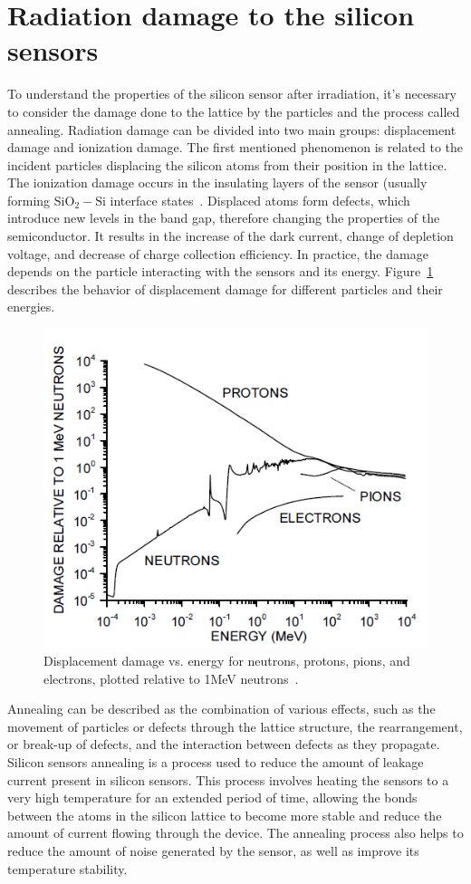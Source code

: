 \section{Radiation damage to the silicon sensors}
\label{silicon_damage}
To understand the properties of the silicon sensor after irradiation, it's necessary to consider the damage done to the lattice by the particles and the process called annealing. Radiation damage can be divided into two main groups: displacement damage and ionization damage. The first mentioned phenomenon is related to the incident particles displacing the silicon atoms from their position in the lattice. The ionization damage occurs in the insulating layers of the sensor (usually forming $\mathrm{SiO_{2}-Si}$ interface states~\cite{Moll:1999kv}. Displaced atoms form defects, which introduce new levels in the band gap, therefore changing the properties of the semiconductor. It results in the increase of the dark current, change of depletion voltage, and decrease of charge collection efficiency. In practice, the damage depends on the particle interacting with the sensors and its energy. Figure~\ref{fig_niel_si} describes the behavior of displacement damage for different particles and their energies.  
\begin{figure}[!h]
\centering
\includegraphics[width=0.7\columnwidth]{Chapter2/images/displacement_damage.png}
\caption{Displacement damage vs. energy for neutrons, protons, pions, and electrons,
plotted relative to 1MeV neutrons~\cite{Spieler}.}
\label{fig_niel_si}
\end{figure}

Annealing can be described as the combination of various effects, such as the movement of particles or defects through the lattice structure, the rearrangement, or break-up of defects, and the interaction between defects as they propagate. Silicon sensors annealing is a process used to reduce the amount of leakage current present in silicon sensors. This process involves heating the sensors to a very high temperature for an extended period of time, allowing the bonds between the atoms in the silicon lattice to become more stable and reduce the amount of current flowing through the device. The annealing process also helps to reduce the amount of noise generated by the sensor, as well as improve its temperature stability. \bigbreak

